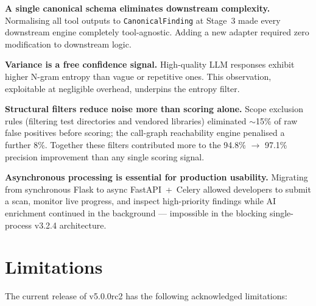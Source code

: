 \textbf{A single canonical schema eliminates downstream complexity.} Normalising all tool outputs to \texttt{CanonicalFinding} at Stage~3 made every downstream engine completely tool-agnostic. Adding a new adapter required zero modification to downstream logic.

\textbf{Variance is a free confidence signal.} High-quality LLM responses exhibit higher N-gram entropy than vague or repetitive ones. This observation, exploitable at negligible overhead, underpins the entropy filter.

\textbf{Structural filters reduce noise more than scoring alone.} Scope exclusion rules (filtering test directories and vendored libraries) eliminated $\sim$15\% of raw false positives before scoring; the call-graph reachability engine penalised a further 8\%. Together these filters contributed more to the 94.8\% $\rightarrow$ 97.1\% precision improvement than any single scoring signal.

\textbf{Asynchronous processing is essential for production usability.} Migrating from synchronous Flask to async FastAPI~+~Celery allowed developers to submit a scan, monitor live progress, and inspect high-priority findings while AI enrichment continued in the background --- impossible in the blocking single-process v3.2.4 architecture.

\section{Limitations}
\label{sec:limitations}

The current release of \ACRQA{} v5.0.0rc2 has the following acknowledged limitations:

